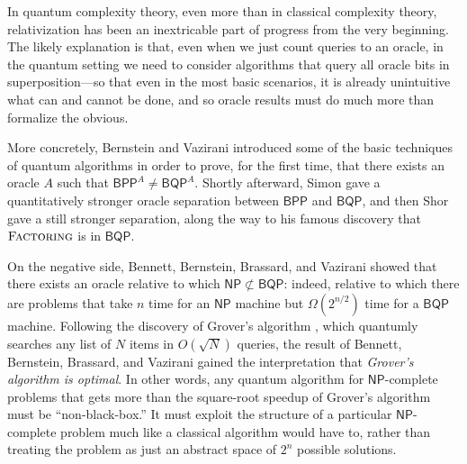 \documentclass[11pt]{article}%
\begin{document}
In quantum complexity theory, even more than in classical complexity theory, relativization has been an inextricable part of progress from the very beginning.  The likely explanation is that, even when we just count queries to an oracle, in the quantum setting we need to consider algorithms that query all oracle bits in superposition---so that even in the most basic scenarios, it is already unintuitive what can and cannot be done, and so oracle results must do much more than formalize the obvious.

More concretely, Bernstein and Vazirani \cite{BV97} introduced some of the basic techniques of quantum algorithms in order to prove, for the first time, that there exists an oracle $A$ such that $\mathsf{BPP}^A \neq \mathsf{BQP}^A$. Shortly afterward, Simon \cite{Sim97} gave a quantitatively stronger oracle
separation between $\mathsf{BPP}$ and $\mathsf{BQP}$, and then Shor \cite{Sho99} gave a still stronger separation, along the way to his famous discovery that $\textsc{Factoring}$ is in $\mathsf{BQP}$.

On the negative side, Bennett, Bernstein, Brassard, and Vazirani \cite{BBBV97} showed that there exists an oracle relative to which $\mathsf{NP} \not\subset \mathsf{BQP}$: indeed, relative to which there are problems that take $n$ time for an $\mathsf{NP}$ machine but $\Omega\left(2^{n/2}\right)$ time for a $\mathsf{BQP}$ machine.  Following the discovery of Grover's algorithm \cite{Gro96}, which quantumly searches any list of $N$ items in $O\left(\sqrt{N}\right)$ queries, the result of Bennett, Bernstein, Brassard, and Vazirani gained the interpretation that \textit{Grover's algorithm is optimal}.  In other words, any quantum algorithm for $\mathsf{NP}$-complete problems that gets more than the square-root speedup of Grover's algorithm must be ``non-black-box.''  It must exploit the structure of a particular $\mathsf{NP}$-complete problem much like a classical algorithm would have to, rather than treating the problem as just an abstract space of $2^n$ possible solutions.
\end{document}
